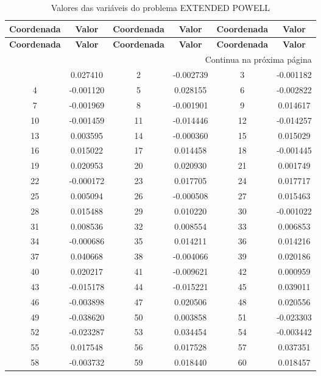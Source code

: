 \documentclass[12pt]{article}
\begin{document}
\small
\begin{longtable}{@{}cc|cc|cc@{}}
\caption{Valores das variáveis do problema EXTENDED POWELL} \\
\toprule
\textbf{Coordenada} & \textbf{Valor} & \textbf{Coordenada} & \textbf{Valor} & \textbf{Coordenada} & \textbf{Valor} \\
\midrule
\endfirsthead

\toprule
\textbf{Coordenada} & \textbf{Valor} & \textbf{Coordenada} & \textbf{Valor} & \textbf{Coordenada} & \textbf{Valor} \\
\midrule
\endhead

\midrule \multicolumn{6}{r}{{Continua na próxima página}} \\ \midrule
\endfoot

\bottomrule
\endlastfoot
1 & 0.027410 & 2 & -0.002739 & 3 & -0.001182 \\
4 & -0.001120 & 5 & 0.028155 & 6 & -0.002822 \\
7 & -0.001969 & 8 & -0.001901 & 9 & 0.014617 \\
10 & -0.001459 & 11 & -0.014446 & 12 & -0.014257 \\
13 & 0.003595 & 14 & -0.000360 & 15 & 0.015029 \\
16 & 0.015022 & 17 & 0.014458 & 18 & -0.001445 \\
19 & 0.020953 & 20 & 0.020930 & 21 & 0.001749 \\
22 & -0.000172 & 23 & 0.017705 & 24 & 0.017717 \\
25 & 0.005094 & 26 & -0.000508 & 27 & 0.015463 \\
28 & 0.015488 & 29 & 0.010220 & 30 & -0.001022 \\
31 & 0.008536 & 32 & 0.008554 & 33 & 0.006853 \\
34 & -0.000686 & 35 & 0.014211 & 36 & 0.014216 \\
37 & 0.040668 & 38 & -0.004066 & 39 & 0.020186 \\
40 & 0.020217 & 41 & -0.009621 & 42 & 0.000959 \\
43 & -0.015178 & 44 & -0.015221 & 45 & 0.039011 \\
46 & -0.003898 & 47 & 0.020506 & 48 & 0.020556 \\
49 & -0.038620 & 50 & 0.003858 & 51 & -0.023303 \\
52 & -0.023287 & 53 & 0.034454 & 54 & -0.003442 \\
55 & 0.017548 & 56 & 0.017528 & 57 & 0.037351 \\
58 & -0.003732 & 59 & 0.018440 & 60 & 0.018457 \\

\end{longtable}
\end{document}
